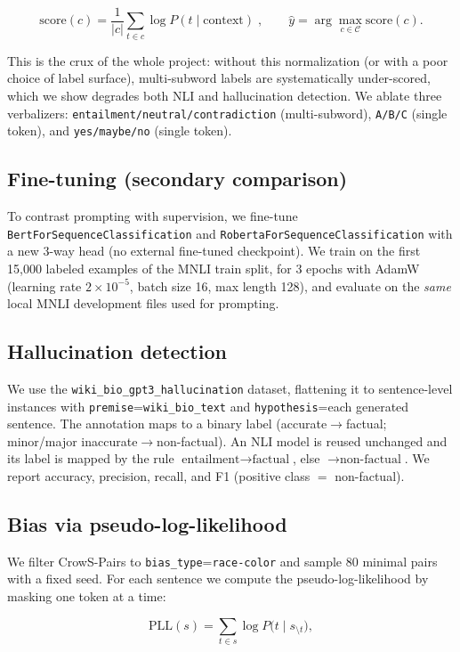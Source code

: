 \documentclass[11pt]{article}
\begin{document}
\[
\mathrm{score}(c)=\frac{1}{|c|}\sum_{t\in c}\log P(t \mid \text{context})\;,\qquad
\hat y = \arg\max_{c\in\mathcal{C}} \mathrm{score}(c).
\]

This is the crux of the whole project: without this normalization (or with a poor choice of label surface), multi-subword labels are systematically under-scored, which we show degrades both NLI and hallucination detection. We ablate three verbalizers: \texttt{entailment/neutral/contradiction} (multi-subword), \texttt{A/B/C} (single token), and \texttt{yes/maybe/no} (single token).

\subsection{Fine-tuning (secondary comparison)}\label{sec:finetune}
To contrast prompting with supervision, we fine-tune \texttt{BertForSequenceClassification} and \texttt{RobertaForSequenceClassification} with a new 3-way head (no external fine-tuned checkpoint). We train on the first 15{,}000 labeled examples of the MNLI train split, for 3 epochs with AdamW (learning rate $2\times10^{-5}$, batch size 16, max length 128), and evaluate on the \emph{same} local MNLI development files used for prompting.

\subsection{Hallucination detection}\label{sec:halluc}
We use the \texttt{wiki\_bio\_gpt3\_hallucination} dataset, flattening it to sentence-level instances with \texttt{premise}=\texttt{wiki\_bio\_text} and \texttt{hypothesis}=each generated sentence. The annotation maps to a binary label (accurate$\to$factual; minor/major inaccurate$\to$non-factual). An NLI model is reused unchanged and its label is mapped by the rule $\text{entailment}\to\text{factual}$, else $\to\text{non-factual}$. We report accuracy, precision, recall, and F1 (positive class $=$ non-factual).

\subsection{Bias via pseudo-log-likelihood}\label{sec:bias}
We filter CrowS-Pairs to \texttt{bias\_type}=\texttt{race-color} and sample 80 minimal pairs with a fixed seed. For each sentence we compute the pseudo-log-likelihood by masking one token at a time:

\[
\mathrm{PLL}(s)=\sum_{t\in s}\log P\bigl(t \mid s_{\setminus t}\bigr),
\]
\end{document}
